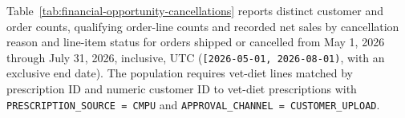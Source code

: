\label{subsec:financial-opportunity-analysis}
Table~\ref{tab:financial-opportunity-cancellations} reports distinct customer and order counts,
qualifying order-line counts and recorded net sales by cancellation reason and line-item status
for orders shipped or cancelled from May 1, 2026 through July 31, 2026, inclusive, UTC
(\texttt{[2026-05-01, 2026-08-01)}, with an exclusive end date).
The population requires vet-diet lines matched by prescription ID and numeric
customer ID to vet-diet prescriptions with
\texttt{PRESCRIPTION\_SOURCE = CMPU} and
\texttt{APPROVAL\_CHANNEL = CUSTOMER\_UPLOAD}.


